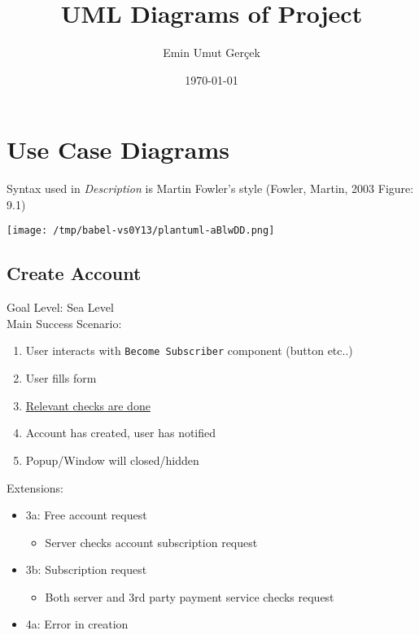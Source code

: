 \documentclass[11pt]{article}
\author{Emin Umut Gerçek}
\date{\today}
\title{UML Diagrams of Project}
\begin{document}
\maketitle
\tableofcontents

\setlength{\parindent}{0cm}


\pagebreak

\section{Use Case Diagrams}
\label{sec:org93bd6dc}
Syntax used in \emph{Description} is Martin Fowler's style (Fowler, Martin, 2003 Figure: 9.1)

\begin{center}
\texttt{[image: /tmp/babel-vs0Y13/plantuml-aBlwDD.png]}
\end{center}

\subsection{Create Account}
\label{sec:org115b9c6}
Goal Level: Sea Level \\
Main Success Scenario: \\

\begin{enumerate}
\item User interacts with \texttt{Become Subscriber} component (button etc..)
\item User fills form
\item \uline{Relevant checks are done}
\item Account has created, user has notified
\item Popup/Window will closed/hidden
\end{enumerate}

Extensions:
\begin{itemize}
\item 3a: Free account request
\begin{itemize}
\item Server checks account subscription request
\end{itemize}
\item 3b: Subscription request
\begin{itemize}
\item Both server and 3rd party payment service checks request
\end{itemize}
\item 4a: Error in creation
\end{itemize}
\end{document}
